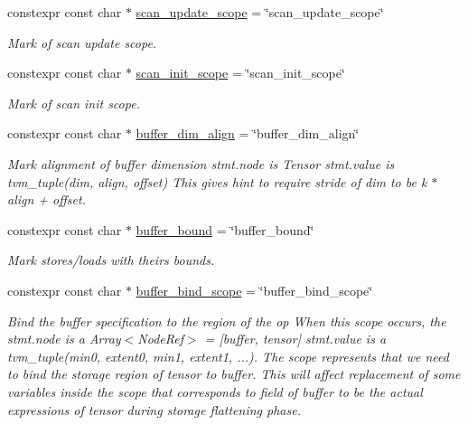 \begin{DoxyCompactItemize}
constexpr const char $\ast$ \hyperlink{namespacetvm_1_1tir_1_1attr_a84f5d42e968fd8f4cdd7a4aac7ba2137}{scan\+\_\+update\+\_\+scope} = \char`\"{}scan\+\_\+update\+\_\+scope\char`\"{}
\begin{DoxyCompactList}\small\item\em Mark of scan update scope. \end{DoxyCompactList}\item 
constexpr const char $\ast$ \hyperlink{namespacetvm_1_1tir_1_1attr_af18e3a9ba11d436e02b55e420647b22b}{scan\+\_\+init\+\_\+scope} = \char`\"{}scan\+\_\+init\+\_\+scope\char`\"{}
\begin{DoxyCompactList}\small\item\em Mark of scan init scope. \end{DoxyCompactList}\item 
constexpr const char $\ast$ \hyperlink{namespacetvm_1_1tir_1_1attr_a0ff3c4642eebe20842b1c26e98288a5d}{buffer\+\_\+dim\+\_\+align} = \char`\"{}buffer\+\_\+dim\+\_\+align\char`\"{}
\begin{DoxyCompactList}\small\item\em Mark alignment of buffer dimension stmt.\+node is Tensor stmt.\+value is tvm\+\_\+tuple(dim, align, offset) This gives hint to require stride of dim to be k $\ast$ align + offset. \end{DoxyCompactList}\item 
constexpr const char $\ast$ \hyperlink{namespacetvm_1_1tir_1_1attr_ac76fd8d0227265617e2f2bb8402d1e19}{buffer\+\_\+bound} = \char`\"{}buffer\+\_\+bound\char`\"{}
\begin{DoxyCompactList}\small\item\em Mark stores/loads with theirs bounds. \end{DoxyCompactList}\item 
constexpr const char $\ast$ \hyperlink{namespacetvm_1_1tir_1_1attr_a0497d7cff1d672920c2fbd4d92869e62}{buffer\+\_\+bind\+\_\+scope} = \char`\"{}buffer\+\_\+bind\+\_\+scope\char`\"{}
\begin{DoxyCompactList}\small\item\em Bind the buffer specification to the region of the op When this scope occurs, the stmt.\+node is a Array$<$\+Node\+Ref$>$ = \mbox{[}buffer, tensor\mbox{]} stmt.\+value is a tvm\+\_\+tuple(min0, extent0, min1, extent1, ...). The scope represents that we need to bind the storage region of tensor to buffer. This will affect replacement of some variables inside the scope that corresponds to field of buffer to be the actual expressions of tensor during storage flattening phase. \end{DoxyCompactList}\item 

\end{DoxyCompactItemize}
